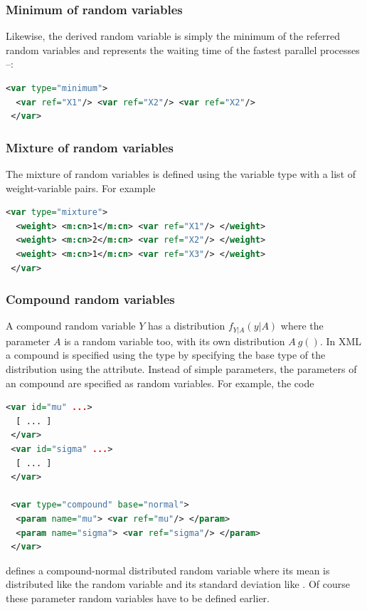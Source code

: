 \documentclass[a4paper, 10pt]{paper}
\begin{document}
\subsubsection{Minimum of random variables}
Likewise, the  derived random variable is simply the minimum of the referred random
variables and represents the waiting time of the fastest parallel processes --:
\begin{lstlisting}[language=XML]
 <var type="minimum">
  <var ref="X1"/> <var ref="X2"/> <var ref="X2"/>
 </var>
\end{lstlisting}

\subsubsection{Mixture of random variables}
The mixture of random variables is defined using the  variable type with a list of
weight-variable pairs. For example
\begin{lstlisting}[language=XML]
 <var type="mixture">
  <weight> <m:cn>1</m:cn> <var ref="X1"/> </weight>
  <weight> <m:cn>2</m:cn> <var ref="X2"/> </weight>
  <weight> <m:cn>1</m:cn> <var ref="X3"/> </weight>
 </var>
\end{lstlisting}

\subsubsection{Compound random variables} 
A compound random variable $Y$ has a distribution $f_{Y|A}(y|A)$ where the parameter $A$ is a random
variable too, with its own distribution $A~g()$. In XML a compound is specified using the 
 type by specifying the base type of the distribution using the  attribute.
Instead of simple parameters, the parameters of an compound are specified as random variables. 
For example, the code
\begin{lstlisting}[language=XML]
 <var id="mu" ...>
  [ ... ]
 </var>
 <var id="sigma" ...>
  [ ... ]
 </var>
 
 <var type="compound" base="normal">
  <param name="mu"> <var ref="mu"/> </param>
  <param name="sigma"> <var ref="sigma"/> </param>
 </var>
\end{lstlisting}
defines a compound-normal distributed random variable where its mean is distributed like the random 
variable  and its standard deviation like . Of course these parameter random 
variables have to be defined earlier.
\end{document}
